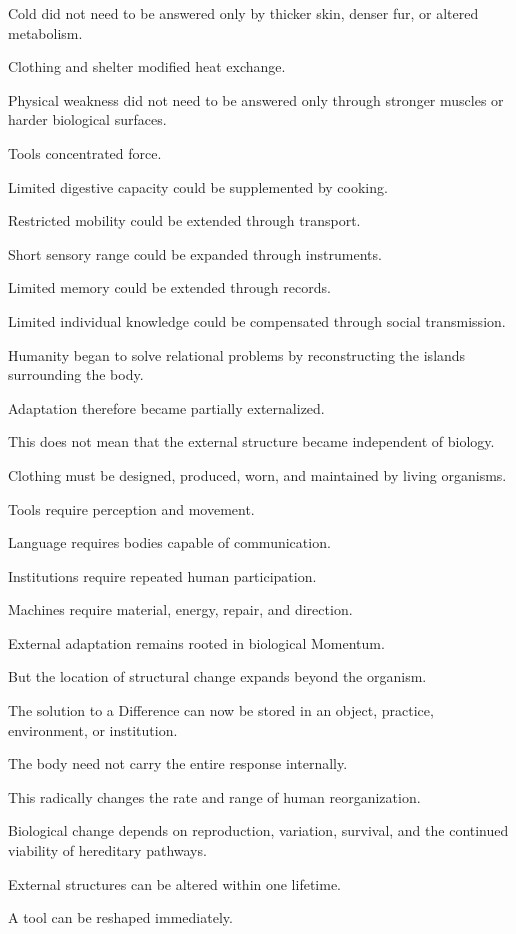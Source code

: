 Cold did not need to be answered only by thicker skin, denser fur, or altered metabolism.

Clothing and shelter modified heat exchange.

Physical weakness did not need to be answered only through stronger muscles or harder biological surfaces.

Tools concentrated force.

Limited digestive capacity could be supplemented by cooking.

Restricted mobility could be extended through transport.

Short sensory range could be expanded through instruments.

Limited memory could be extended through records.

Limited individual knowledge could be compensated through social transmission.

Humanity began to solve relational problems by reconstructing the islands surrounding the body.

Adaptation therefore became partially externalized.

This does not mean that the external structure became independent of biology.

Clothing must be designed, produced, worn, and maintained by living organisms.

Tools require perception and movement.

Language requires bodies capable of communication.

Institutions require repeated human participation.

Machines require material, energy, repair, and direction.

External adaptation remains rooted in biological Momentum.

But the location of structural change expands beyond the organism.

The solution to a Difference can now be stored in an object, practice, environment, or institution.

The body need not carry the entire response internally.

This radically changes the rate and range of human reorganization.

Biological change depends on reproduction, variation, survival, and the continued viability of hereditary pathways.

External structures can be altered within one lifetime.

A tool can be reshaped immediately.

